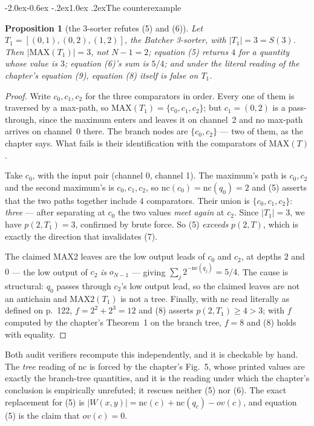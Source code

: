 \documentclass[11pt,a4paper]{article}
\makeatletter
\renewcommand\subsection{\@startsection{subsection}{2}{\z@}%
  {-2.0ex\@plus -0.6ex \@minus -.2ex}{1.0ex \@plus .2ex}{\normalfont\normalsize\bfseries}}
\newtheorem{proposition}[statement]{Proposition}
\newcommand{\MAX}{\mathrm{MAX}}
\newcommand{\MAXTWO}{\mathrm{MAX2}}
\newcommand{\nc}{\mathrm{nc}}
\makeatother
\begin{document}
\subsection{The counterexample}

\begin{proposition}[the 3-sorter refutes (5) and (6)]
\label{prop:cex}
Let $T_1 = [(0,1),(0,2),(1,2)]$, the Batcher 3-sorter, with $|T_1| = 3 = S(3)$.
Then $|\MAX(T_1)| = 3$, not $N-1 = 2$; equation (5) returns $4$ for a quantity
whose value is $3$; equation (6)'s sum is $5/4$; and under the literal reading
of the chapter's equation (9), equation (8) itself is false on $T_1$.
\end{proposition}

\begin{proof}
Write $c_0, c_1, c_2$ for the three comparators in order. Every one of them is
traversed by a max-path, so $\MAX(T_1) = \{c_0,c_1,c_2\}$; but
$c_1 = (0,2)$ is a pass-through, since the maximum enters and leaves it on
channel~2 and no max-path arrives on channel~0 there. The branch nodes are
$\{c_0, c_2\}$ --- two of them, as the chapter says. What fails is their
identification with the comparators of $\MAX(T)$.

Take $c_0$, with the input pair (channel 0, channel 1). The maximum's path is
$c_0, c_2$ and the second maximum's is $c_0, c_1, c_2$, so
$\nc(c_0) = \nc(q_0) = 2$ and (5) asserts that the two paths together include
$4$ comparators. Their union is $\{c_0,c_1,c_2\}$: \emph{three} --- after
separating at $c_0$ the two values \emph{meet again} at $c_2$. Since
$|T_1| = 3$, we have $p(2,T_1) = 3$, confirmed by brute force. So (5)
\emph{exceeds} $p(2,T)$, which is exactly the direction that invalidates (7).

The claimed MAX2 leaves are the low output leads of $c_0$ and $c_2$, at depths
$2$ and $0$ --- the low output of $c_2$ \emph{is} $o_{N-1}$ --- giving
$\sum_j 2^{-\nc(q_j)} = 5/4$. The cause is structural: $q_0$ passes through
$c_2$'s low output lead, so the claimed leaves are not an antichain and
$\MAXTWO(T_1)$ is not a tree. Finally, with $\nc$ read literally as defined on
p.~122, $f = 2^2 + 2^3 = 12$ and (8) asserts $p(2,T_1) \ge 4 > 3$; with $f$
computed by the chapter's Theorem~1 on the branch tree, $f = 8$ and (8) holds
with equality.
\end{proof}

Both audit verifiers recompute this independently, and it is checkable by hand.
The \emph{tree} reading of $\nc$ is forced by the chapter's Fig.~5, whose
printed values are exactly the branch-tree quantities, and it is the reading
under which the chapter's conclusion is empirically unrefuted; it rescues
neither (5) nor (6). The exact replacement for (5) is
$|W(x,y)| = \nc(c) + \nc(q_c) - ov(c)$, and equation (5) is the claim that
$ov(c) = 0$.
\end{document}
